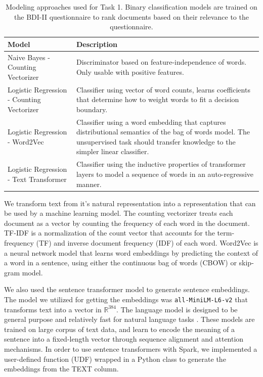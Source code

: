 \documentclass[]{style/ceurart}
\begin{document}
\begin{table}[h]
  \centering
  \caption{
    Modeling approaches used for Task 1.
    Binary classification models are trained on the BDI-II questionnaire to rank documents based on their relevance to the questionnaire.
  }

  \label{tab:task1-models}
  \renewcommand{\arraystretch}{1.2}
  \begin{tabular}{p{2.5in}p{3.5in}}
  \toprule
  \textbf{Model} & \textbf{Description} \\ \midrule
  Naive Bayes - Counting Vectorizer & Discriminator based on feature-independence of words. Only usable with positive features. \\ \midrule
  Logistic Regression - Counting Vectorizer & Classifier using vector of word counts, learns coefficients that determine how to weight words to fit a decision boundary. \\ \midrule
  Logistic Regression - Word2Vec  & Classifier using a word embedding that captures distributional semantics of the bag of words model. The unsupervised task should transfer knowledge to the simpler linear classifier. \\ \midrule
  Logistic Regression - Text Transformer & Classifier using the inductive properties of transformer layers to model a sequence of words in an auto-regressive manner. \\ \bottomrule
  \end{tabular}
\end{table}

We transform text from it's natural representation into a representation that can be used by a machine learning model.
The counting vectorizer treats each document as a vector by counting the frequency of each word in the document.
TF-IDF is a normalization of the count vector that accounts for the term-frequency (TF) and inverse document frequency (IDF) of each word.
Word2Vec is a neural network model that learns word embeddings by predicting the context of a word in a sentence, using either the continuous bag of words (CBOW) or skip-gram model.

We also used the sentence transformer model \cite{reimers_sentence-bert_2019} to generate sentence embeddings.
The model we utilized for getting the embeddings was \texttt{all-MiniLM-L6-v2} that transforms text into a vector in $\mathbb{R}^{384}$.
The language model is designed to be general purpose and relatively fast for natural language tasks \cite{noauthor_sentence-transformersall-minilm-l6-v2_nodate}.
These models are trained on large corpus of text data, and learn to encode the meaning of a sentence into a fixed-length vector through sequence alignment and attention mechanisms.
In order to use sentence transformers with Spark, we implemented a user-defined function (UDF) wrapped in a Python class to generate the embeddings from the TEXT column.
\end{document}
